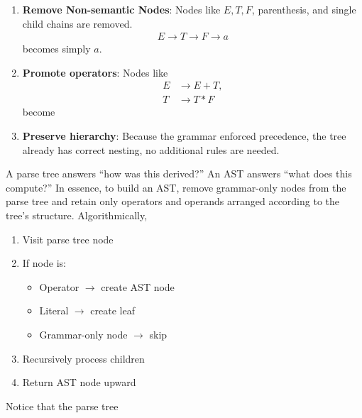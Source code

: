 \documentclass{report}
\begin{document}
\begin{itemize}
\begin{enumerate}
                \item \textbf{Remove Non-semantic Nodes}: Nodes like $E,T,F$, parenthesis, and single child chains are removed.
                    \begin{align*}
                        E \to T \to F \to a
                    \end{align*}
                    becomes simply $a$.
                \item \textbf{Promote operators}: Nodes like
                    \begin{align*}
                        E &\to E + T, \\
                        T &\to T * F
                    \end{align*}
                    become
                    \bigbreak \noindent 
                    \bigbreak \noindent 
                \item \textbf{Preserve hierarchy}: Because the grammar enforced precedence, the tree already has correct nesting, no additional rules are needed.
                    \bigbreak \noindent 
            \end{enumerate}
            A parse tree answers “how was this derived?” An AST answers “what does this compute?”
            \bigbreak \noindent 
            In essence, to build an AST, remove grammar-only nodes from the parse tree and retain only operators and operands arranged according to the tree’s structure.
            \bigbreak \noindent 
            Algorithmically, 
            \begin{enumerate}
                \item Visit parse tree node
                \item If node is:
                    \begin{itemize}
                        \item Operator $\to $ create AST node
                        \item Literal $\to $ create leaf
                        \item Grammar-only node $\to $ skip
                    \end{itemize}
                \item Recursively process children
                \item Return AST node upward
            \end{enumerate}
            Notice that the parse tree

\end{itemize}
\end{document}
